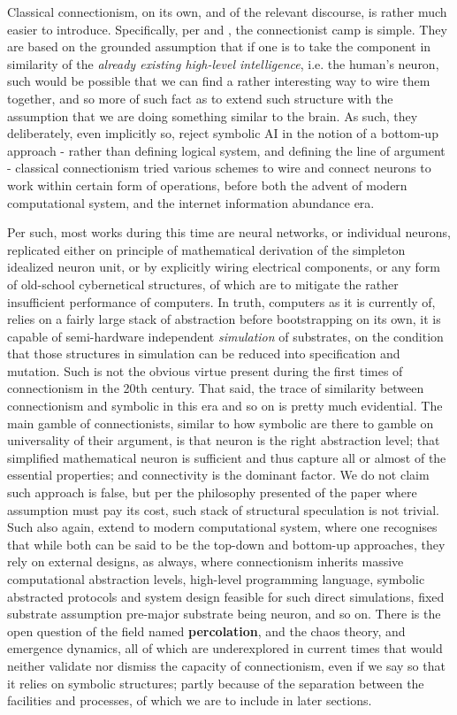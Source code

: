 Classical connectionism, on its own, and of the relevant discourse, is rather much easier to introduce. Specifically, per \cite{rosenblatt_1958} and \cite{mcculloch_logical_1943}, the connectionist camp is simple. They are based on the grounded assumption that if one is to take the component in similarity of the \textit{already existing high-level intelligence}, i.e. the human's neuron, such would be possible that we can find a rather interesting way to wire them together, and so more of such fact as to extend such structure with the assumption that we are doing something similar to the brain. As such, they deliberately, even implicitly so, reject symbolic AI in the notion of a bottom-up approach - rather than defining logical system, and defining the line of argument - classical connectionism tried various schemes to wire and connect neurons to work within certain form of operations, before both the advent of modern computational system, and the internet information abundance era. 

Per such, most works during this time are neural networks, or individual neurons, replicated either on principle of mathematical derivation of the simpleton idealized neuron unit, or by explicitly wiring electrical components, or any form of old-school cybernetical structures, of which are to mitigate the rather insufficient performance of computers. In truth, computers as it is currently of, relies on a fairly large stack of abstraction before bootstrapping on its own, it is capable of semi-hardware independent \textit{simulation} of substrates, on the condition that those structures in simulation can be reduced into specification and mutation. Such is not the obvious virtue present during the first times of connectionism in the 20th century. That said, the trace of similarity between connectionism and symbolic in this era and so on is pretty much evidential. The main gamble of connectionists, similar to how symbolic are there to gamble on universality of their argument, is that neuron is the right abstraction level; that simplified mathematical neuron is sufficient and thus capture all or almost of the essential properties; and connectivity is the dominant factor. We do not claim such approach is false, but per the philosophy presented of the paper where assumption must pay its cost, such stack of structural speculation is not trivial. Such also again, extend to modern computational system, where one recognises that while both can be said to be the top-down and bottom-up approaches, they rely on external designs, as always, where connectionism inherits massive computational abstraction levels, high-level programming language, symbolic abstracted protocols and system design feasible for such direct simulations, fixed substrate assumption pre-major substrate being neuron, and so on. There is the open question of the field named \textbf{percolation}, and the chaos theory, and emergence dynamics, all of which are underexplored in current times that would neither validate nor dismiss the capacity of connectionism, even if we say so that it relies on symbolic structures; partly because of the separation between the facilities and processes, of which we are to include in later sections. 

